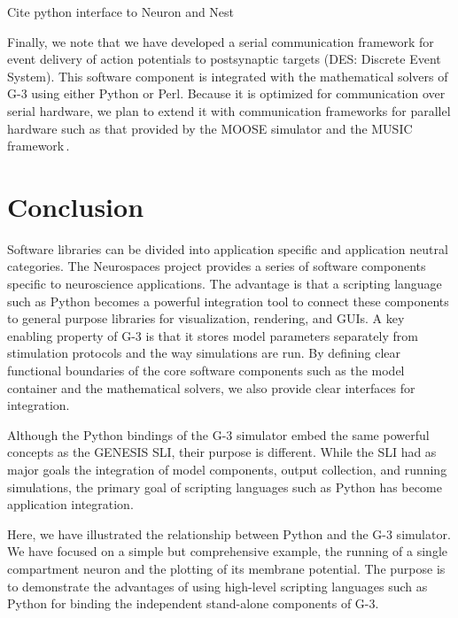 \documentclass[12pt]{article}
\begin{document}
Cite python interface to Neuron and Nest

Finally, we note that we have developed a serial communication
framework for event delivery of action potentials to postsynaptic
targets (DES: Discrete Event System).  This software component is
integrated with the mathematical solvers of G-3 using either Python or
Perl.  Because it is optimized for communication over serial hardware,
we plan to extend it with communication frameworks for parallel
hardware such as that provided by the MOOSE
simulator\cite{ray08:_pymoos} and the MUSIC
framework\,\cite{ekeberg08:_music_multis_coord}.


\vspace*{-4mm}
\section{Conclusion}

Software libraries can be divided into application specific and
application neutral categories.  The Neurospaces project provides a
series of software components specific to neuroscience applications.
The advantage is that a scripting language such as Python becomes a
powerful integration tool to connect these components to general
purpose libraries for visualization, rendering, and GUIs.  A key
enabling property of G-3 is that it stores model parameters separately
from stimulation protocols and the way simulations are run.  By
defining clear functional boundaries of the core software components
such as the model container and the mathematical solvers, we also
provide clear interfaces for integration.

Although the Python bindings of the G-3 simulator embed the same
powerful concepts as the GENESIS SLI, their purpose is different.
While the SLI had as major goals the integration of model components,
output collection, and running simulations, the primary goal of
scripting languages such as Python has become application integration.

Here, we have illustrated the relationship between Python and the G-3
simulator.  We have focused on a simple but comprehensive example, the
running of a single compartment neuron and the plotting of its
membrane potential. The purpose is to demonstrate the advantages of
using high-level scripting languages such as Python for binding the
independent stand-alone components of G-3.
\end{document}
